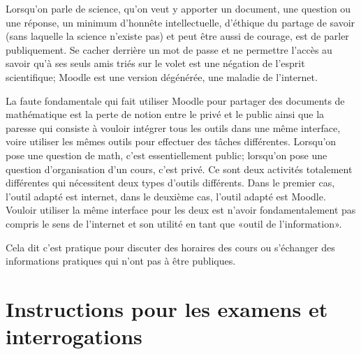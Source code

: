 Lorsqu'on parle de science, qu'on veut y apporter un document, une question ou une réponse, un minimum d'honnête intellectuelle, d'éthique du partage de savoir (sans laquelle la science n'existe pas) et peut être aussi de courage, est de parler publiquement. Se cacher derrière un mot de passe et ne permettre l'accès au savoir qu'à ses seuls amis triés sur le volet est une négation de l'esprit scientifique; Moodle est une version dégénérée, une maladie de l'internet.

La faute fondamentale qui fait utiliser Moodle pour partager des documents de mathématique est la perte de notion entre le privé et le public ainsi que la paresse qui consiste à vouloir intégrer tous les outils dans une même interface, voire utiliser les mêmes outils pour effectuer des tâches différentes. Lorsqu'on pose une question de math, c'est essentiellement public; lorsqu'on pose une question d'organisation d'un cours, c'est privé. Ce sont deux activités totalement différentes qui nécessitent deux types d'outils différents. Dans le premier cas, l'outil adapté est internet, dans le deuxième cas, l'outil adapté est Moodle. Vouloir utiliser la même interface pour les deux est n'avoir fondamentalement pas compris le sens de l'internet et son utilité en tant que «outil de l'information».



{\tiny Cela dit c'est pratique pour discuter des horaires des cours ou s'échanger des informations pratiques qui n'ont pas à être publiques.}

\section{Instructions pour les examens et interrogations}

